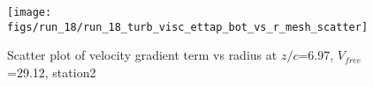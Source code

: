 \begin{figure}[H]
\centering
\texttt{[image: figs/run\_18/run\_18\_turb\_visc\_ettap\_bot\_vs\_r\_mesh\_scatter]}
\caption{Scatter plot of velocity gradient term vs radius at $z/c$=6.97, $V_{free}$=29.12, station2}
\label{fig:run_18_turb_visc_ettap_bot_vs_r_mesh_scatter}
\end{figure}


